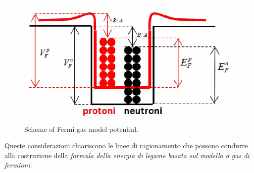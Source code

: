 \begin{figure}
	\centering
	\includegraphics{../figs/fermi-gas-model-potential-scheme}
	\caption{Scheme of Fermi gas model potential.}
	\label{fig:fermi-gas-model-potential-scheme}
\end{figure}

Queste considerazioni chiariscono le linee di ragionamento che possono condurre alla costruzione della \emph{formula della energia di legame basata sul modello a gas di fermioni}.

